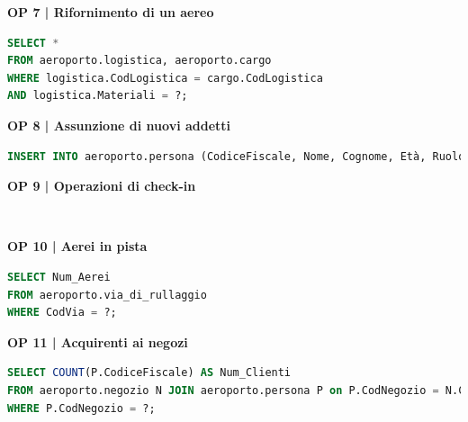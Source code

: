 \newpage %

\textbf{\small OP 7 | Rifornimento di un aereo}\\

\begin{lstlisting}[language=SQL]
SELECT *
FROM aeroporto.logistica, aeroporto.cargo
WHERE logistica.CodLogistica = cargo.CodLogistica
AND logistica.Materiali = ?;	
\end{lstlisting}


\textbf{\small OP 8 | Assunzione di nuovi addetti}\\

\begin{lstlisting}[language=SQL]
INSERT INTO aeroporto.persona (CodiceFiscale, Nome, Cognome, Età, Ruolo, Ora_inizio, Ora_fine) VALUES (?, ?, ?, ?, ?, ?, ?);	
\end{lstlisting}


\textbf{\small OP 9 | Operazioni di check-in }\\ %

\begin{lstlisting}[language=SQL]
	
\end{lstlisting}


\textbf{\small OP 10 | Aerei in pista}\\ %

\begin{lstlisting}[language=SQL]
SELECT Num_Aerei
FROM aeroporto.via_di_rullaggio
WHERE CodVia = ?;	
\end{lstlisting}


\textbf{\small OP 11 | Acquirenti ai negozi}\\ %

\begin{lstlisting}[language=SQL]
SELECT COUNT(P.CodiceFiscale) AS Num_Clienti
FROM aeroporto.negozio N JOIN aeroporto.persona P on P.CodNegozio = N.CodNegozio
WHERE P.CodNegozio = ?;
\end{lstlisting}


